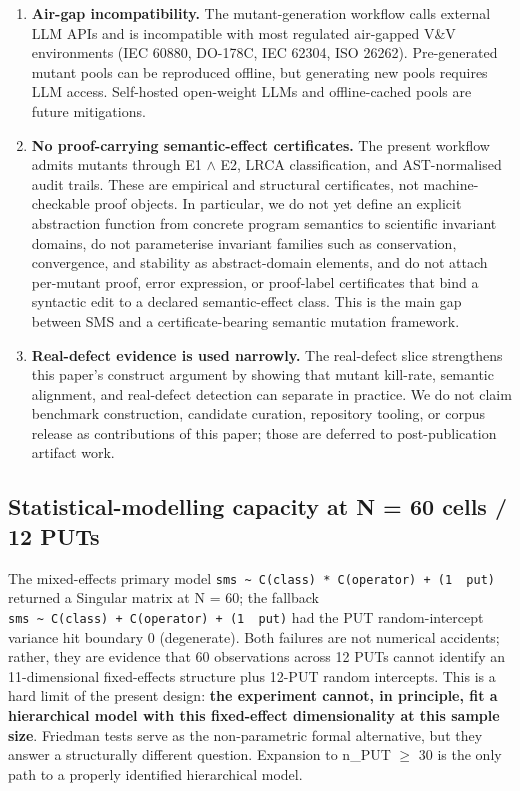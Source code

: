 \documentclass[acmsmall,screen,review]{acmart}
\begin{document}
\begin{enumerate}
  semantic complexity. A portability study should validate SMS on
  industrial-grade multi-output PUTs.
\item
  \textbf{Air-gap incompatibility.} The mutant-generation workflow calls
  external LLM APIs and is incompatible with most regulated air-gapped
  V\&V environments (IEC 60880, DO-178C, IEC 62304, ISO 26262).
  Pre-generated mutant pools can be reproduced offline, but generating
  new pools requires LLM access. Self-hosted open-weight LLMs and
  offline-cached pools are future mitigations.
\item
  \textbf{No proof-carrying semantic-effect certificates.} The present
  workflow admits mutants through E1 $\wedge$ E2, LRCA classification, and
  AST-normalised audit trails. These are empirical and structural
  certificates, not machine-checkable proof objects. In particular, we
  do not yet define an explicit abstraction function from concrete
  program semantics to scientific invariant domains, do not parameterise
  invariant families such as conservation, convergence, and stability as
  abstract-domain elements, and do not attach per-mutant proof, error
  expression, or proof-label certificates that bind a syntactic edit to
  a declared semantic-effect class. This is the main gap between SMS and
  a certificate-bearing semantic mutation framework.
\item
  \textbf{Real-defect evidence is used narrowly.} The real-defect slice
  strengthens this paper's construct argument by showing that mutant
  kill-rate, semantic alignment, and real-defect detection can separate
  in practice. We do not claim benchmark construction, candidate curation,
  repository tooling, or corpus release as contributions of this paper;
  those are deferred to post-publication artifact work.
\end{enumerate}

\subsection{Statistical-modelling capacity at N = 60 cells / 12 PUTs}\label{statistical-modelling-capacity-at-n-60-cells-12-puts}

The mixed-effects primary model
\texttt{sms\ \textasciitilde{}\ C(class)\ *\ C(operator)\ +\ (1\ \textbar{}\ put)}
returned a Singular matrix at N = 60; the fallback
\texttt{sms\ \textasciitilde{}\ C(class)\ +\ C(operator)\ +\ (1\ \textbar{}\ put)}
had the PUT random-intercept variance hit boundary 0 (degenerate). Both
failures are not numerical accidents; rather, they are evidence that 60
observations across 12 PUTs cannot identify an 11-dimensional
fixed-effects structure plus 12-PUT random intercepts. This is a hard
limit of the present design: \textbf{the experiment cannot, in
principle, fit a hierarchical model with this fixed-effect
dimensionality at this sample size}. Friedman tests serve as the
non-parametric formal alternative, but they answer a structurally
different question. Expansion to n\_PUT $\geq$ 30 is the only path to a
properly identified hierarchical model.
\end{document}
